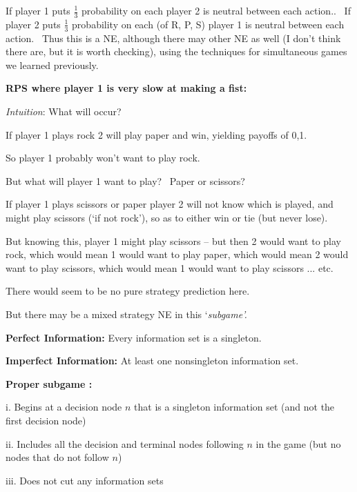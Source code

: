 If player 1 puts $\frac{1}{3}$ probability on each player 2 is neutral
between each action.. \ If player 2 puts $\frac{1}{3}$ probability on each
(of R, P, S) player 1 is neutral between each action. \ Thus this is a NE,
although there may other NE as well (I don't think there are, but it is
worth checking), using the techniques for simultaneous games we learned
previously.


\textbf{RPS where player 1 is very slow at making a fist:}


\textit{Intuition}: What will occur?

If player 1 plays rock 2 will play paper and win, yielding payoffs of 0,1.

So player 1 probably won't want to play rock.

But what will player 1 want to play? \ Paper or scissors?

If player 1 plays scissors or paper player 2 will not know which is played,
and might play scissors (`if not rock'), so as to either win or tie (but
never lose).

But knowing this, player 1 might play scissors -- but then 2 would want to
play rock, which would mean 1 would want to play paper, which would mean 2
would want to play scissors, which would mean 1 would want to play scissors
... etc.

There would seem to be no pure strategy prediction here. \ \

But there may be a mixed strategy NE in this `\textit{subgame'.}



\textbf{Perfect Information: }Every information set is a singleton.

\textbf{Imperfect Information: }At least one nonsingleton information set.

\textbf{Proper subgame :}

i. Begins at a decision node $n$ that is a singleton information set (and
not the first decision node)

ii. Includes all the decision and terminal nodes following $n$ in the game
(but no nodes that do not follow $n$)

iii. Does not cut any information sets


